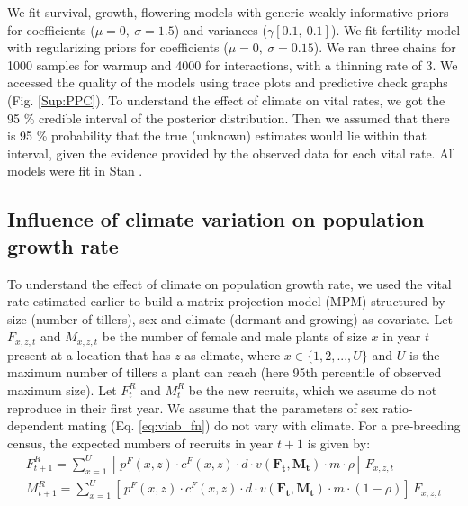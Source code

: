 \documentclass[12pt]{article}
\begin{document}
We fit survival, growth, flowering models with generic weakly informative priors for coefficients ($\mu = 0,\ \sigma = 1.5$) and variances ($\gamma [0.1,\ 0.1]$).
We fit fertility model with regularizing priors for coefficients ($\mu = 0,\ \sigma = 0.15$).
We ran three chains for 1000 samples for warmup and 4000 for interactions, with a thinning rate of 3.
We accessed the quality of the models using trace plots and predictive check graphs \citep{piironen2017comparison} (Fig. \ref{Sup:PPC}).
To understand the effect of climate on vital rates, we got the 95 \% credible interval of the posterior distribution.  
Then we assumed that there is 95 \% probability that the true (unknown) estimates would lie within that interval, given the evidence provided by the observed data for each vital rate.
All models were fit in Stan \citep{rstan}. 

\subsection*{Influence of climate variation on population growth rate}
To understand the effect of climate on population growth rate, we used the vital rate estimated earlier to build a matrix projection model (MPM) structured by size (number of tillers), sex and climate (dormant and growing) as covariate.  
Let $F_{x,z,t}$ and $M_{x,z,t}$ be the number of female and male plants of size $x$ in year $t$ present at a location that has $z$ as climate, where $x \in \{1,2,...,U\}$ and $U$ is the maximum number of tillers a plant can reach (here 95th percentile of observed maximum size).
Let $F^{R}_{t}$ and $M^{R}_{t}$ be the new recruits, which we assume do not reproduce in their first year.
We assume that the parameters of sex ratio-dependent mating (Eq. \ref{eq:viab_fn}) do not vary with climate.  
For a pre-breeding census, the expected numbers of recruits in year $t+1$ is given by:
\begin{align}\label{eq:recruits}
F^{R}_{t+1} = \sum_{x=1}^{U} 	[ \, p^{F}(x,z) \cdot c^{F}(x,z) \cdot d \cdot v(\mathbf{F_{t}},\mathbf{M_{t}}) \cdot m \cdot \rho 	] \, F_{x,z,t}
\\
M^{R}_{t+1} = \sum_{x=1}^{U} 	[ \, p^{F}(x,z) \cdot c^{F}(x,z) \cdot d \cdot v(\mathbf{F_{t}},\mathbf{M_{t}}) \cdot m \cdot (1-\rho) 	] \, F_{x,z,t}
\end{align}
\end{document}
